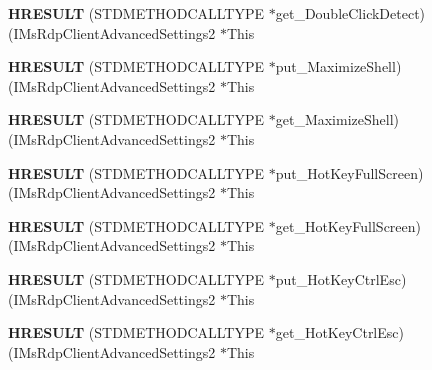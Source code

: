 \begin{DoxyCompactItemize}
{\bfseries H\+R\+E\+S\+U\+LT} (S\+T\+D\+M\+E\+T\+H\+O\+D\+C\+A\+L\+L\+T\+Y\+PE $\ast$get\+\_\+\+Double\+Click\+Detect)(I\+Ms\+Rdp\+Client\+Advanced\+Settings2 $\ast$This
\item 
\mbox{\label{struct_i_ms_rdp_client_advanced_settings2_vtbl_a7cacc7a8c202fd364d9c59a7bf4b39e7}} 
{\bfseries H\+R\+E\+S\+U\+LT} (S\+T\+D\+M\+E\+T\+H\+O\+D\+C\+A\+L\+L\+T\+Y\+PE $\ast$put\+\_\+\+Maximize\+Shell)(I\+Ms\+Rdp\+Client\+Advanced\+Settings2 $\ast$This
\item 
\mbox{\label{struct_i_ms_rdp_client_advanced_settings2_vtbl_a4af3a6ce87a6fb9090be5565168117ba}} 
{\bfseries H\+R\+E\+S\+U\+LT} (S\+T\+D\+M\+E\+T\+H\+O\+D\+C\+A\+L\+L\+T\+Y\+PE $\ast$get\+\_\+\+Maximize\+Shell)(I\+Ms\+Rdp\+Client\+Advanced\+Settings2 $\ast$This
\item 
\mbox{\label{struct_i_ms_rdp_client_advanced_settings2_vtbl_a1b0608bac89f786c535386101d03d505}} 
{\bfseries H\+R\+E\+S\+U\+LT} (S\+T\+D\+M\+E\+T\+H\+O\+D\+C\+A\+L\+L\+T\+Y\+PE $\ast$put\+\_\+\+Hot\+Key\+Full\+Screen)(I\+Ms\+Rdp\+Client\+Advanced\+Settings2 $\ast$This
\item 
\mbox{\label{struct_i_ms_rdp_client_advanced_settings2_vtbl_a4c14d373006d3fee584f1eac0d612cc3}} 
{\bfseries H\+R\+E\+S\+U\+LT} (S\+T\+D\+M\+E\+T\+H\+O\+D\+C\+A\+L\+L\+T\+Y\+PE $\ast$get\+\_\+\+Hot\+Key\+Full\+Screen)(I\+Ms\+Rdp\+Client\+Advanced\+Settings2 $\ast$This
\item 
\mbox{\label{struct_i_ms_rdp_client_advanced_settings2_vtbl_a2055a0297634784782c5991fc74c37b2}} 
{\bfseries H\+R\+E\+S\+U\+LT} (S\+T\+D\+M\+E\+T\+H\+O\+D\+C\+A\+L\+L\+T\+Y\+PE $\ast$put\+\_\+\+Hot\+Key\+Ctrl\+Esc)(I\+Ms\+Rdp\+Client\+Advanced\+Settings2 $\ast$This
\item 
\mbox{\label{struct_i_ms_rdp_client_advanced_settings2_vtbl_afbcecc230e5951102e54319cbc07590c}} 
{\bfseries H\+R\+E\+S\+U\+LT} (S\+T\+D\+M\+E\+T\+H\+O\+D\+C\+A\+L\+L\+T\+Y\+PE $\ast$get\+\_\+\+Hot\+Key\+Ctrl\+Esc)(I\+Ms\+Rdp\+Client\+Advanced\+Settings2 $\ast$This

\end{DoxyCompactItemize}
